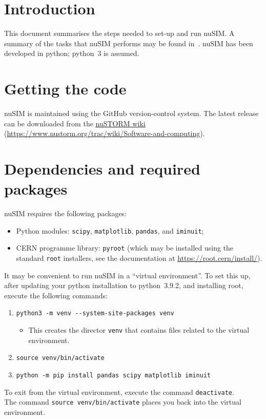 \section*{Introduction}
This document summarises the steps needed to set-up and run nuSIM.
A summary of the tasks that nuSIM performs may be found
in~\cite{2021:nuSIM:Doc.01}.
nuSIM has been developed in python; python~3 is assumed.

\section*{Getting the code}
nuSIM is maintained using the GitHub version-control system.
The latest release can be downloaded from the
\href{https://www.nustorm.org}{\underline{\color{blue} nuSTORM wiki}}
(\href{https://www.nustorm.org/trac/wiki/Software-and-computing}{\underline{\color{blue}}https://www.nustorm.org/trac/wiki/Software-and-computing}).

\section*{Dependencies and required packages}
nuSIM requires the following packages:
\begin{itemize}
  \item Python modules: \verb+scipy+, \verb+matplotlib+, \verb+pandas+, and \verb+iminuit+;
  \item CERN programme library: \verb+pyroot+ (which may be installed
    using the standard \verb+root+ installers, see the documentation
    at \href{https://root.cern/install/}{\underline{\color{blue}https://root.cern/install/}}).
\end{itemize}
It may be convenient to run nuSIM in a ``virtual environment''.
To set this up, after updating your python installation to python~3.9.2,
and installing root, execute the following commands:
\begin{enumerate}
  \item \verb+python3 -m venv --system-site-packages venv+
    \begin{itemize}
      \item This creates the director \verb+venv+ that contains files
        related to the virtual environment.
    \end{itemize}
  \item \verb+source venv/bin/activate+
  \item \verb+python -m pip install pandas scipy matplotlib iminuit+
\end{enumerate}
To exit from the virtual environment, execute the command
\verb+deactivate+. \\
\noindent
The command \verb+source venv/bin/activate+ places you back
into the virtual environment.


